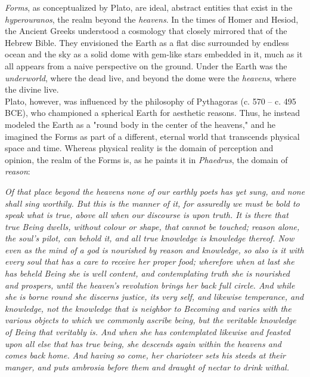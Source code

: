 \textit{Forms}, as conceptualized by Plato, are ideal, abstract entities that exist in the \textit{hyperouranos}, the realm beyond the \textit{heavens}. In the times of Homer and Hesiod, the Ancient Greeks understood a cosmology that closely mirrored that of the Hebrew Bible. They envisioned the Earth as a flat disc surrounded by endless ocean and the sky as a solid dome with gem-like stars embedded in it, much as it all appears from a naive perspective on the ground. Under the Earth was the \textit{underworld}, where the dead live, and beyond the dome were the \textit{heavens}, where the divine live. \\


Plato, however, was influenced by the philosophy of Pythagoras (c. 570 -- c. 495 BCE), who championed a spherical Earth for aesthetic reasons. Thus, he instead modeled the Earth as a "round body in the center of the heavens," and he imagined the Forms as part of a different, eternal world that transcends physical space and time. Whereas physical reality is the domain of perception and opinion, the realm of the Forms is, as he paints it in \textit{Phaedrus}, the domain of \textit{reason}: \\

\begin{displayquote}
	\textit{Of that place beyond the heavens none of our earthly poets has yet sung, and none shall sing worthily. But this is the manner of it, for assuredly we must be bold to speak what is true, above all when our discourse is upon truth. It is there that true Being dwells, without colour or shape, that cannot be touched; reason alone, the soul's pilot, can behold it, and all true knowledge is knowledge thereof. Now even as the mind of a god is nourished by reason and knowledge, so also is it with every soul that has a care to receive her proper food; wherefore when at last she has beheld Being she is well content, and contemplating truth she is nourished and prospers, until the heaven's revolution brings her back full circle. And while she is borne round she discerns justice, its very self, and likewise temperance, and knowledge, not the knowledge that is neighbor to Becoming and varies with the various objects to which we commonly ascribe being, but the veritable knowledge of Being that veritably is. And when she has contemplated likewise and feasted upon all else that has true being, she descends again within the heavens and comes back home. And having so come, her charioteer sets his steeds at their manger, and puts ambrosia before them and draught of nectar to drink withal.}
	\vspace{4mm}
\end{displayquote}

